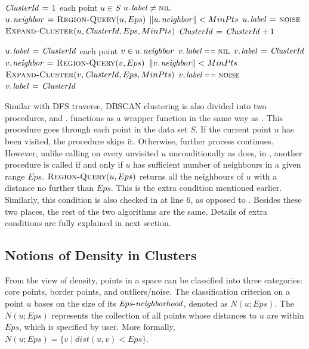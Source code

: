 \begin{codebox}
\li	$\id{ClusterId} \gets 1$
\li	\For each point $u \in S$
\li	\Do
		\If $\attrib{u}{label} \neq \const{nil}$
\li		\Then	
		\End		
\li			$\attrib{u}{neighbor} \gets \proc{Region-Query}(u, Eps)$
\li			\If	$\| \attrib{u}{neighbor} \| < MinPts $
\li				\Then
					$\attrib{u}{label} \gets \const{noise}$
\li			\Else
\li				$\proc{Expand-Cluster}(u, \id{ClusterId}, Eps, MinPts)$
\li				$\id{ClusterId} \gets \id{ClusterId} + 1$
			\End
	\End
\end{codebox}

\begin{codebox}
\li	$\attrib{u}{label} \gets \id{ClusterId}$
\li	\For each point $v \in \attrib{u}{neighbor}$
\li	\Do
		\If $\attrib{v}{label} \isequal \const{nil}$
\li		\Then
			$\attrib{v}{label} \gets \id{ClusterId}$
\li			$\attrib{v}{neighbor} \gets \proc{Region-Query}(v, Eps)$
\li				\If	$\| \attrib{v}{neighbor} \| < MinPts $
\li				\Then
					$\proc{Expand-Cluster}(v, \id{ClusterId}, Eps, MinPts)$
				\End
\li		\ElseIf $\attrib{v}{label} \isequal \const{noise}$
\li		\Then
			$\attrib{v}{label} \gets \id{ClusterId}$
		\End
	\End
\end{codebox}

Similar with DFS traverse, DBSCAN clustering is also divided into two procedures,  and .  functions as a wrapper function in the same way as . This procedure goes through each point in the data set $S$. If the current point $u$ has been visited, the procedure skips it. Otherwise, further process continues. However, unlike calling  on every unvisited $u$ unconditionally as  does, in , another procedure  is called if and only if $u$ has sufficient number of neighbours in a given range $Eps$. $\textnormal{\scshape Region-Query}(u, Eps)$ returns all the neighbours of $u$ with a distance no further than $Eps$. This is the extra condition mentioned earlier. Similarly, this condition is also checked in  at line 6, as opposed to . Besides these two places, the rest of the two algorithms are the same. Details of extra conditions are fully explained in next section. 

\subsection{Notions of Density in Clusters}
\label{subsec:DBSCANnotion}
From the view of density, points in a space can be classified into three categories: core points, border points, and outliers/noise. The classification criterion on a point $u$ bases on the size of its $\id{Eps-neighborhood}$, denoted as $N(u;Eps)$. The $N(u;Eps)$ represents the collection of all points whose distances to $u$ are within $Eps$, which is specified by user. More formally, $N(u;Eps) = \{v\mid dist(u, v) < Eps\}$. 

